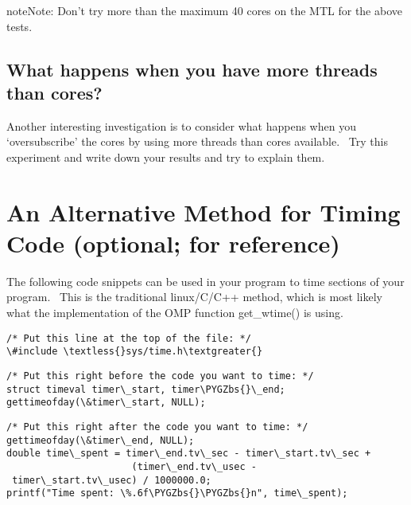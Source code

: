 \documentclass[letterpaper,10pt,openany,oneside]{sphinxmanual}
\def\PYGZbs{\char`\\}
\begin{document}
\begin{notice}{note}{Note:}
Don't try more than the maximum 40 cores on the MTL for the above tests.
\end{notice}


\subsection{What happens when you have more threads than cores?}
\label{timingAndScalability/TimingOnMTLandscalability:what-happens-when-you-have-more-threads-than-cores}
Another interesting investigation is to consider what happens when you
‘oversubscribe’ the cores by using more threads than cores available.
 Try this experiment and write down your results and try to explain
them.


\section{An Alternative Method for Timing Code (optional; for reference)}
\label{timingAndScalability/TimingOnMTLandscalability:an-alternative-method-for-timing-code-optional-for-reference}
The following code snippets can be used in your program to time sections
of your program.  This is the traditional linux/C/C++ method, which is
most likely what the implementation of the OMP function get\_wtime() is
using.

\begin{Verbatim}[commandchars=\\\{\}]
/* Put this line at the top of the file: */
\#include \textless{}sys/time.h\textgreater{}
\end{Verbatim}

\begin{Verbatim}[commandchars=\\\{\}]
/* Put this right before the code you want to time: */
struct timeval timer\_start, timer\PYGZbs{}\_end;
gettimeofday(\&timer\_start, NULL);
\end{Verbatim}

\begin{Verbatim}[commandchars=\\\{\}]
/* Put this right after the code you want to time: */
gettimeofday(\&timer\_end, NULL);
double time\_spent = timer\_end.tv\_sec - timer\_start.tv\_sec +
                      (timer\_end.tv\_usec - timer\_start.tv\_usec) / 1000000.0;
printf("Time spent: \%.6f\PYGZbs{}\PYGZbs{}n", time\_spent);
\end{Verbatim}
\end{document}
